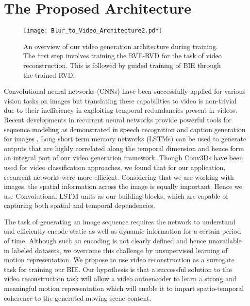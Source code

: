 \documentclass[10pt,twocolumn,letterpaper]{article}
\begin{document}
\section{The Proposed Architecture}
\label{sec:proposed architecture}

\begin{figure*}
\begin{center}
   \texttt{[image: Blur\_to\_Video\_Architecture2.pdf]}
\end{center}
   \caption{An overview of our video generation architecture during training. The first step involves training the RVE-RVD for the task of video reconstruction. This is followed by guided training of BIE through the trained RVD.}
\label{fig:architecture}
\end{figure*}


 
Convolutional neural networks (CNNs) have been successfully applied for various vision tasks on images but translating these capabilities to video is non-trivial due to their inefficiency in exploiting temporal redundancies present in videos. Recent developments in recurrent neural networks provide powerful tools for sequence modeling as demonstrated in speech recognition \cite{graves2013speech} and caption generation for images \cite{vinyals2015show}. Long  short term memory networks (LSTMs) can be used to generate outputs that are highly correlated along the temporal dimension and hence form an integral part of our video generation framework. Though Conv3Ds have been used for video classification approaches, we found that for our application, recurrent networks were more efficient. Considering that we are working with images, the spatial information across the image is equally important. Hence we use Convolutional LSTM units \cite{xingjian2015convolutional} as our building blocks, which are capable of capturing both spatial and temporal dependencies.

The task of generating an image sequence requires the network to understand and efficiently encode static as well as dynamic information for a certain period of time. Although such an encoding is not clearly defined and hence unavailable in labeled datasets, we overcome this challenge by unsupervised learning of motion representation. We propose to use video reconstruction as a surrogate task for training our BIE. Our hypothesis is that a successful solution to the video reconstruction task will allow a video autoencoder to learn a strong and meaningful motion representation which will enable it to impart spatio-temporal coherence to the generated moving scene content. 
\end{document}
